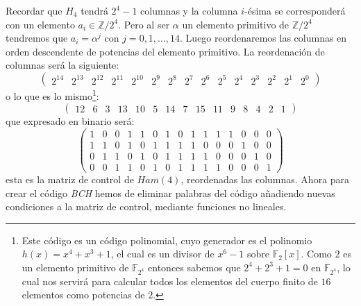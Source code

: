 Recordar que $H_4$ tendr\'a $2^4-1$ columnas y la columna $i$-\'esima se
co\-rres\-pon\-de\-r\'a con un elemento $a_i\in \mathbb{Z}/2^4$. Pero al ser
$\alpha$ un elemento primitivo de $\mathbb{Z}/2^4$ tendremos que $a_i=\alpha^j$
con $j=0,1,\dots,14$. Luego reordenaremos las columnas en orden descendente de
potencias del elemento primitivo.
%
\newpage
%
La reordenaci\'on de columnas ser\'a la siguiente:
\begin{displaymath}
\left( \begin{array}{ccccccccccccccc}
2^{14}&2^{13}&2^{12}&2^{11}&2^{10}&2^9&2^8&2^7&2^6&2^5&2^4&2^3&2^2&2^1&2^0
\end{array} \right)
\end{displaymath}
o lo que es lo mismo\footnote{Este c\'odigo es un c\'odigo polinomial, cuyo
generador es el polinomio $h(x)=x^4+x^3+1$, el cual es un divisor de $x^6-1$
sobre $\mathbb{F}_2[x]$. Como $2$ es un elemento primitivo de $\mathbb{F}_{2^4}$
entonces sabemos que $2^4+2^3+1=0$ en $\mathbb{F}_{2^4}$, lo cual nos servir\'a
para calcular todos los elementos del cuerpo finito de $16$ elementos como
potencias de $2$.}:
\begin{displaymath}
\left( \begin{array}{ccccccccccccccc}
12&6&3&13&10&5&14&7&15&11&9&8&4&2&1
\end{array} \right)
\end{displaymath}
que expresado en binario ser\'a:
\begin{displaymath}
\left( \begin{array}{ccccccccccccccc}
1&0&0&1&1&0&1&0&1&1&1&1&0&0&0\\
1&1&0&1&0&1&1&1&1&0&0&0&1&0&0\\
0&1&1&0&1&0&1&1&1&1&0&0&0&1&0\\
0&0&1&1&0&1&0&1&1&1&1&0&0&0&1
\end{array} \right)
\end{displaymath}
esta es la matriz de control de $Ham(4)$, reordenadas las columnas. Ahora para
crear el c\'odigo \emph{BCH} hemos de eliminar palabras del c\'odigo a\~nadiendo
nuevas condiciones a la matriz de control, mediante funciones no lineales.\\

